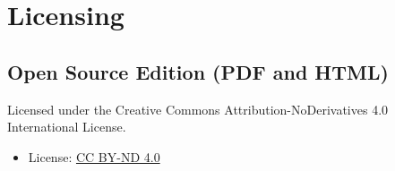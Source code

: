 \documentclass[
  12pt,
  openany]{book}
\begin{document}
\section*{Licensing}

\subsection*{Open Source Edition (PDF and HTML)}
Licensed under the Creative Commons Attribution-NoDerivatives 4.0 International License.

\begin{itemize}
  \item License: \href{https://creativecommons.org/licenses/by-nd/4.0/}{CC BY-ND 4.0}
\end{itemize}


\vspace*{\fill}

\newpage
\thispagestyle{empty}









\clearpage
{}


\end{document}

